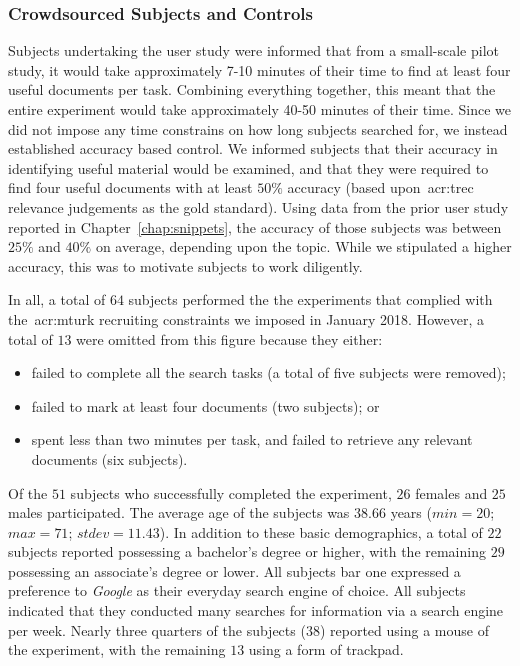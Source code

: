 \subsubsection{Crowdsourced Subjects and Controls}
Subjects undertaking the user study were informed that from a small-scale pilot study, it would take approximately 7-10 minutes of their time to find at least four useful documents per task. Combining everything together, this meant that the entire experiment would take approximately 40-50 minutes of their time. Since we did not impose any time constrains on how long subjects searched for, we instead established accuracy based control. We informed subjects that their accuracy in identifying useful material would be examined, and that they were required to find four useful documents with at least $50\%$ accuracy (based upon~\gls{acr:trec} relevance judgements as the gold standard). Using data from the prior user study reported in Chapter~\ref{chap:snippets}, the accuracy of those subjects was between $25\%$ and $40\%$ on average, depending upon the topic. While we stipulated a higher accuracy, this was to motivate subjects to work diligently.

In all, a total of $64$ subjects performed the the experiments that complied with the~\gls{acr:mturk} recruiting constraints we imposed in January 2018. However, a total of $13$ were omitted from this figure because they either:

\begin{itemize}
    \item{failed to complete all the search tasks (a total of five subjects were removed);}
    \item{failed to mark at least four documents (two subjects); or}
    \item{spent less than two minutes per task, and failed to retrieve any relevant documents (six subjects).}
\end{itemize}

Of the $51$ subjects who successfully completed the experiment, $26$ females and $25$ males participated. The average age of the subjects was $38.66$ years ($min=20$; $max=71$; $stdev=11.43$). In addition to these basic demographics, a total of $22$ subjects reported possessing a bachelor's degree or higher, with the remaining $29$ possessing an associate's degree or lower. All subjects bar one expressed a preference to \emph{Google} as their everyday search engine of choice. All subjects indicated that they conducted many searches for information via a search engine per week. Nearly three quarters of the subjects ($38$) reported using a mouse of the experiment, with the remaining $13$ using a form of trackpad.


